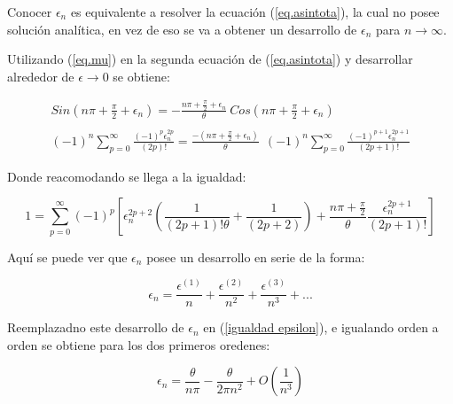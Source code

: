 Conocer $\epsilon _n $ es equivalente a resolver la ecuación (\ref{eq.asintota}), la cual no posee solución analítica, en vez de eso se va a obtener un desarrollo de $\epsilon _n $ para $n \rightarrow \infty$.

Utilizando (\ref{eq.mu}) en la segunda ecuación de (\ref{eq.asintota}) y desarrollar alrededor de $\epsilon \rightarrow{0}$ se obtiene:

\begin{equation}
\begin{array}{c}
    Sin( n \pi + \frac{\pi}{2} + \epsilon _n ) = 
    - \frac{n \pi + \frac{\pi}{2} + \epsilon _n}{\theta}  \ Cos( n \pi + \frac{\pi}{2} + \epsilon _n )  \\
 \\

         (-1) ^n \sum _{p=0} ^{\infty} \frac{(-1) ^p  \epsilon _n ^{2 p }}{(2p)!} 
    =  \frac{-(n \pi + \frac{\pi}{2} + \epsilon _n) }{\theta}  \  \	
    (-1) ^n
     \sum _{p=0} ^{\infty} \frac{(-1) ^ {p+1} \epsilon _n ^{2 p + 1}}{(2p+1)!} 
\end{array}
\end{equation}


Donde reacomodando se llega a la igualdad:

\begin{equation}
    1 = 
    \sum _{p=0} ^{\infty} (-1) ^p     \left[
   	\epsilon _n ^{2p+2 }\left( \frac{1}{(2p+1)! \theta } + \frac{1}{(2p+2)} \right) +
  	\frac{n \pi + \frac{\pi}{2}}{\theta} \frac{  \epsilon _n ^{2p+1}}{(2p+1)!} 			\right]
\label{igualdad epsilon}
\end{equation}

Aquí se puede ver que  $\epsilon _n $ posee un desarrollo en serie de la forma:

\begin{equation}
    \epsilon _n = 
    \frac{\epsilon ^{(1)}}{n}  + 
    \frac{\epsilon ^{(2)}}{n ^2}  + 
    \frac{\epsilon ^{(3)}}{n ^3}  + ...
\label{eq.epsilon}
\end{equation}


Reemplazadno este desarrollo de $\epsilon _n$ en (\ref{igualdad epsilon}), e igualando orden a orden se obtiene para los dos primeros oredenes:

\begin{equation}
    \epsilon _n = \frac{\theta}{n \pi} 
     - \frac{ \theta}{2 \pi n ^2 } + O \left( \frac{1}{n ^3}\right) 
\label{epsilons}
\end{equation}

\newpage


